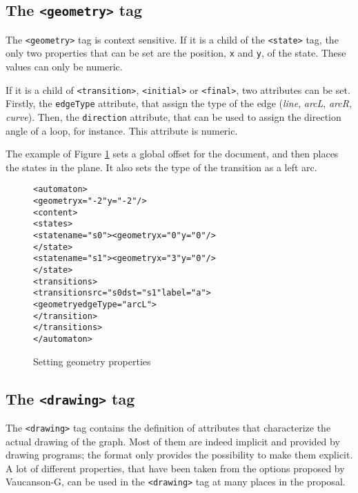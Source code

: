 \documentclass[a4paper]{article}
\def\statetag{\texttt{<state>}}
\def\dstname{\texttt{dst}}
\def\srcname{\texttt{src}}
\def\transitiontag{\texttt{<transition>}}
\def\finaltag{\texttt{<final>}}
\def\initialtag{\texttt{<initial>}}
\def\geometrytag{\texttt{<geometry>}}
\def\drawingtag{\texttt{<drawing>}}
\begin{document}
\subsection{The \geometrytag{} tag}

The \geometrytag{} tag is context sensitive. If it is a child of
the \statetag{} tag, the only two properties that can be set are the
position, \verb|x| and \verb|y|, of the state. These values can only be numeric.

If it is a child of \transitiontag{}, \initialtag{} or
\finaltag{}, two attributes can be set. Firstly, the \texttt{edgeType}
attribute, that assign the type of the edge (\textit{line},
\textit{arcL}, \textit{arcR}, \textit{curve}). Then, the
\texttt{direction} attribute, that can be used to assign the direction
angle of a loop, for instance. This attribute is numeric.

The example of Figure \ref{geom1} sets a global offset
for the document, and then places the states in the plane.
It also sets the type of the transition as a left arc.
{\small

\begin{figure}[h]
  \begin{center}
\begin{alltt}
<automaton>
  <geometry x="-2" y="-2"/>
  <content>
     <states>
        <state name="s0"><geometry x="0" y="0"/>
        </state>
        <state name="s1"><geometry x="3" y="0"/>
        </state>
     <transitions>
        <transition \srcname{}="s0 \dstname{}="s1" label="a">
          <geometry edgeType="arcL">
        </transition>
     </transitions>
</automaton>
\end{alltt}

\caption{Setting geometry properties}
\label{geom1}
  \end{center}
\end{figure}

}

\subsection{The \drawingtag{} tag}

The \drawingtag{} tag contains the definition of attributes that characterize
the actual drawing of the graph.
Most of them are indeed implicit and provided by drawing programs; the
format only provides the possibility to make them explicit.
A lot of different properties, that have been taken from the options proposed by
Vaucanson-G, can be used in the \drawingtag{} tag at many places in the proposal.
\end{document}
